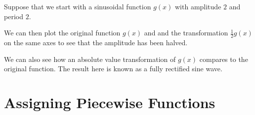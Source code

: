 Suppose that we start with a sinusoidal function $g(x)$ with amplitude $2$ and period $2$.

\begin{maplegroup}
\begin{mapleinput}
\end{mapleinput}
\end{maplegroup}

\begin{maplegroup}
\begin{mapleinput}
\end{mapleinput}
\mapleresult
{}
\end{maplegroup}


We can then plot the original function $g(x)$ and and the transformation $\frac{1}{2}g(x)$ on the same axes to see that the amplitude has been halved.

\begin{maplegroup}
\begin{mapleinput}
\end{mapleinput}
\mapleresult
{}
\end{maplegroup}

We can also see how an absolute value transformation of $g(x)$ compares to the original function. The result here is known as a fully rectified sine wave.

\begin{maplegroup}
\begin{mapleinput}
\end{mapleinput}
\mapleresult
{}
\end{maplegroup}


\section{Assigning Piecewise Functions}
\label{sec:piecewise}


